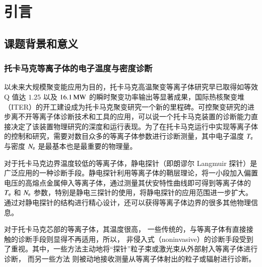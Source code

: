 ﻿\graphicspath{{figures/chap01/}}

\chapter{引言}\label{chap:introduction}

\section{课题背景和意义}

\subsection{托卡马克等离子体的电子温度与密度诊断}

以未来大规模聚变能应用为目的，托卡马克高温聚变等离子体研究早已取得如等效 Q 值达 $1.25$\cite{JT60U:Q1.25} 以及 $16.1\,{\rm MW}$\cite{JET:NF:16MW:1,JET:NF:16MW:2} 的瞬时聚变功率输出等显著成果，国际热核聚变堆（ITER）的开工建设\cite{Holtkamp2007:ITER}成为托卡马克聚变研究一个新的里程碑。可控聚变研究的进步离不开等离子体诊断技术和工具的应用，可以说一个托卡马克装置的诊断能力直接决定了该装置物理研究的深度和运行表现。为了在托卡马克运行中实现等离子体的控制和研究，需要对数目众多的等离子体参数进行诊断测量，其中电子温度 $T_{\rm e}$ 与密度 $N_{\rm e}$ 是最基本也是最重要的物理量\cite{ITERPhysics:chap7}。

对于托卡马克边界温度较低的等离子体，静电探针（即朗谬尔 Langmuir 探针）\cite{LangmuirProbe}是广泛应用的一种诊断手段。静电探针利用等离子体的鞘层理论，将一小段加入偏置电压的高熔点金属伸入等离子体，通过测量其伏安特性曲线即可得到等离子体的 $T_{\rm e}$ 和 $N_{\rm e}$ 参数，特别是静电三探针\cite{tripleprobe}的使用，将静电探针的应用范围进一步扩大。通过对静电探针的结构进行精心设计，还可以获得等离子体边界的很多其他物理信息\cite{LangmiurProbe-EdgeTurbulance,LangmiurProbe-ZonalFlow}。

对于托卡马克芯部的等离子体，其温度很高，
一些传统的，与等离子体有直接接触的诊断手段则显得不再适用，所以，
非侵入式（noninvasive）的诊断手段受到了重视。其中，一些方法主动地将“探针”粒子束或激光束从外部射入等离子体进行诊断，%
而另一些方法%
则被动地接收测量从等离子体射出的粒子或辐射进行诊断。

